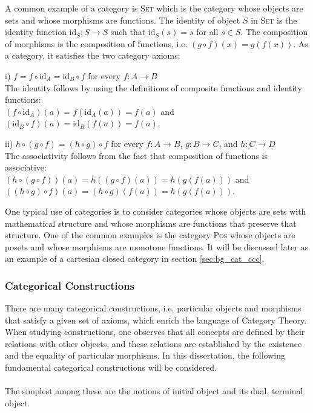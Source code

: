 A common example of a category is \textsc{Set} which is the category whose objects are sets and whose morphisms are functions. The identity of object $ S $ in \textsc{Set} is the identity function $ \text{id}_S : S \to S $ such that $ \text{id}_S(s) = s $ for all $ s \in S $. The composition of morphisms is the composition of functions, i.e. $ (g \circ f)(x) = g(f(x)) $. As a category, it satisfies the two category axioms:
\begin{myitemize}
\item[i)] $ f = f \circ \text{id}_A = \text{id}_B \circ f $ for every $ f: A \to B $\\
The identity follows by using the definitions of composite functions and identity functions:\\
$ (f \circ \text{id}_A)(a) = f(\text{id}_A(a)) = f(a) $ and $ (\text{id}_B \circ f)(a) = \text{id}_B(f(a)) = f(a) $.
\item[ii)] $ h \circ (g \circ f) = (h \circ g) \circ f $ for every $ f: A \to B $, $ g: B \to C$, and $ h: C \to D $\\
The associativity follows from the fact that composition of functions is associative:\\
$ (h \circ (g \circ f))(a) = h((g \circ f)(a)) = h(g(f(a))) $ and\\
$ ((h \circ g) \circ f)(a) = (h \circ g)(f(a)) = h(g(f(a))) $.
\end{myitemize}

One typical use of categories is to consider categories whose objects are sets with mathematical structure and whose morphisms are functions that preserve that structure. One of the common examples is the category \textsc{Pos} whose objects are posets and whose morphisms are monotone functions. It will be discussed later as an example of a cartesian closed category in section \ref{sec:bg_cat_ccc}.


\subsubsection{Categorical Constructions}
\label{sec:bg_cat_cc}
There are many categorical constructions, i.e. particular objects and morphisms that satisfy a given set of axioms, which enrich the language of Category Theory. When studying constructions, one observes that all concepts are defined by their relations with other objects, and these relations are established by the existence and the equality of particular morphisms. In this dissertation, the following fundamental categorical constructions will be considered.
\\
\\
The simplest among these are the notions of initial object and its dual, terminal object.

